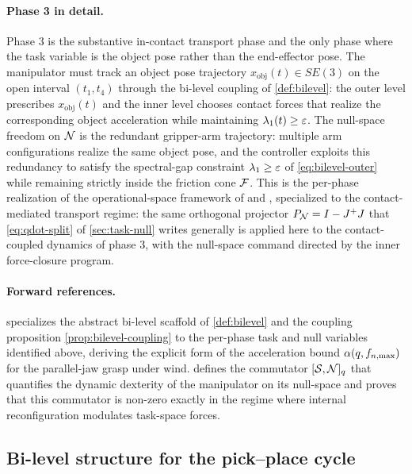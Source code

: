 \paragraph{Phase 3 in detail.}
Phase 3 is the substantive in-contact transport phase and the
only phase where the task variable is the object pose rather than
the end-effector pose. The manipulator must track an object pose
trajectory $x_{\mathrm{obj}}(t) \in SE(3)$ on the open interval
$(t_{1}, t_{4})$ through the bi-level coupling of
\cref{def:bilevel}: the outer level prescribes
$x_{\mathrm{obj}}(t)$ and the inner level chooses contact forces
that realize the corresponding object acceleration while
maintaining $\lambda_{1}(t) \ge \varepsilon$. The null-space freedom
on $\mathcal{N}$ is the redundant gripper-arm trajectory: multiple arm
configurations realize the same object pose, and the controller
exploits this redundancy to satisfy the spectral-gap constraint
$\lambda_{1} \ge \varepsilon$ of \cref{eq:bilevel-outer} while
remaining strictly inside the friction cone $\mathcal{F}$. This
is the per-phase realization of the operational-space framework
of \citet{Khatib1987} and \citet{Nakamura1991}, specialized to
the contact-mediated transport regime: the same orthogonal
projector $P_{\mathcal{N}} = I - J^{+} J$ that
\eqref{eq:qdot-split} of \cref{sec:task-null} writes generally is
applied here to the contact-coupled dynamics of phase 3, with the
null-space command directed by the inner force-closure program.

\paragraph{Forward references.}
 specializes the abstract bi-level
scaffold of \cref{def:bilevel} and the coupling proposition
\cref{prop:bilevel-coupling} to the per-phase task and null
variables identified above, deriving the explicit form of the
acceleration bound $\alpha(q, f_{n,\max})$ for the
parallel-jaw grasp under wind. 
defines the commutator $[\mathcal{S}, \mathcal{N}]_{q}$ that quantifies
the dynamic dexterity of the manipulator on its null-space and
proves that this commutator is non-zero exactly in the regime
where internal reconfiguration modulates task-space forces.

\subsection{Bi-level structure for the pick--place cycle}
\label{sec:hierarchical-bilevel}


